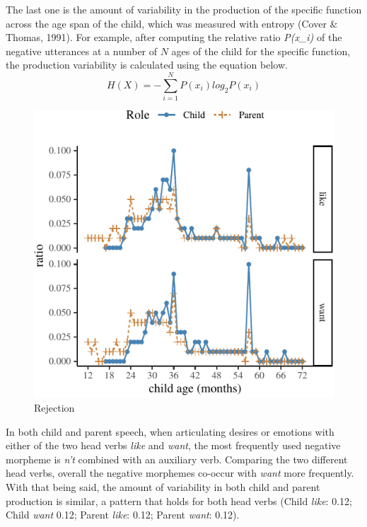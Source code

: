 \documentclass[10pt, letterpaper]{article}
\newenvironment{CodeChunk}{}{}
\begin{document}
The last one is the amount of variability in the production of the
specific function across the age span of the child, which was measured
with entropy (Cover \& Thomas, 1991). For example, after computing the
relative ratio \emph{P(x\_i)} of the negative utterances at a number of
\(N\) ages of the child for the specific function, the production
variability is calculated using the equation below. \begin{equation}
H(X) = -\sum_{i=1}^N P(x_i)log_2P(x_i) 
\end{equation}

\begin{CodeChunk}
\begin{figure}[H]

{\centering \includegraphics{figs/emotion-1} 

}

\caption[Rejection]{Rejection}\label{fig:emotion}
\end{figure}
\end{CodeChunk}

In both child and parent speech, when articulating desires or emotions
with either of the two head verbs \emph{like} and \emph{want}, the most
frequently used negative morpheme is \emph{n't} combined with an
auxiliary verb. Comparing the two different head verbs, overall the
negative morphemes co-occur with \emph{want} more frequently. With that
being said, the amount of variability in both child and parent
production is similar, a pattern that holds for both head verbs (Child
\emph{like}: 0.12; Child \emph{want} 0.12; Parent \emph{like}: 0.12;
Parent \emph{want}: 0.12).
\end{document}
